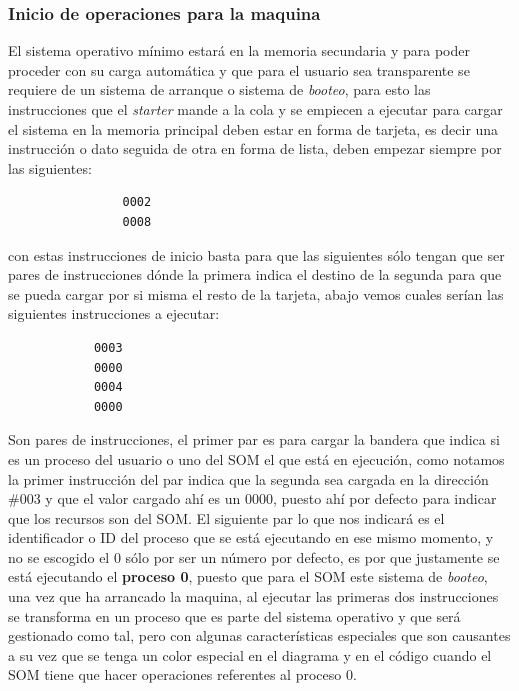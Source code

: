 \documentclass[letterpaper,12pt,oneside]{book}
\begin{document}
		\subsubsection{Inicio de operaciones para la maquina}
		
		El sistema operativo mínimo estará en la memoria secundaria y para poder proceder con su carga automática y que para el usuario sea transparente se
		requiere de un sistema de arranque o sistema de \textit{booteo}, para esto las instrucciones que el \textit{starter} mande a la cola y se empiecen a ejecutar
		para cargar el sistema en la memoria principal deben estar en forma de tarjeta, es decir una instrucción o dato seguida de otra en forma de lista,
		deben empezar siempre por las siguientes:

		\begin{center}
		\begin{minipage}{0\textwidth}
			\begin{verbatim}
				0002
				0008
			\end{verbatim}	
		\end{minipage}
		\end{center}
		
		con estas instrucciones de inicio basta para que las siguientes sólo tengan que ser pares de instrucciones dónde la primera indica el destino de la segunda
		para que se pueda cargar por si misma el resto de la tarjeta, abajo vemos cuales serían 
		las siguientes instrucciones a ejecutar:
		
		\begin{center}
		\begin{minipage}{0\textwidth}
			\begin{verbatim}
			0003
			0000
			0004
			0000
			\end{verbatim}	
		\end{minipage}
		\end{center}
		
		Son pares de instrucciones, el primer par es para cargar la bandera que indica si es un proceso del usuario o uno del SOM el que está en ejecución,
		como notamos la primer instrucción del par indica que la segunda sea cargada en la dirección \#003 y que el valor cargado ahí es un 0000, puesto
		ahí por defecto para indicar que los recursos son del SOM. El siguiente par lo que nos indicará es el identificador o ID del proceso
		que se está ejecutando en ese mismo momento, y no se escogido el 0 sólo por ser un número por defecto, es por que justamente se está ejecutando el 
		\textbf{proceso 0}, puesto que para el SOM este sistema de \textit{booteo}, una vez que ha arrancado la maquina, al ejecutar las primeras dos instrucciones
		se transforma en un proceso que es parte del sistema operativo y que será gestionado como tal, pero con algunas características especiales que son
		causantes a su vez que se tenga un color especial en el diagrama y en el código cuando el SOM tiene que hacer operaciones referentes al proceso 0.
		
\end{document}
